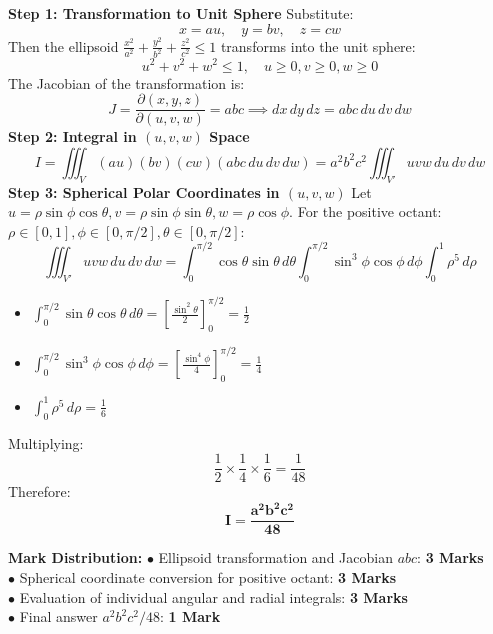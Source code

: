 \begin{solutionbox}
\textbf{Step 1: Transformation to Unit Sphere}
Substitute:
\[
x = a u, \quad y = b v, \quad z = c w
\]
Then the ellipsoid $\frac{x^2}{a^2} + \frac{y^2}{b^2} + \frac{z^2}{c^2} \le 1$ transforms into the unit sphere:
\[
u^2 + v^2 + w^2 \le 1, \quad u \ge 0, v \ge 0, w \ge 0
\]
The Jacobian of the transformation is:
\[
J = \frac{\partial(x,y,z)}{\partial(u,v,w)} = abc \implies dx \, dy \, dz = abc \, du \, dv \, dw
\]
\textbf{Step 2: Integral in $(u, v, w)$ Space}
\[
I = \iiint_V (a u)(b v)(c w) (abc \, du \, dv \, dw) = a^2 b^2 c^2 \iiint_{V'} u v w \, du \, dv \, dw
\]
\textbf{Step 3: Spherical Polar Coordinates in $(u,v,w)$}
Let $u = \rho\sin\phi\cos\theta, v = \rho\sin\phi\sin\theta, w = \rho\cos\phi$.
For the positive octant: $\rho \in [0, 1], \phi \in [0, \pi/2], \theta \in [0, \pi/2]$:
\[
\iiint_{V'} u v w \, du \, dv \, dw = \int_0^{\pi/2} \cos\theta\sin\theta \, d\theta \int_0^{\pi/2} \sin^3\phi\cos\phi \, d\phi \int_0^1 \rho^5 \, d\rho
\]
\begin{itemize}[leftmargin=6mm]
    \item $\int_0^{\pi/2} \sin\theta\cos\theta \, d\theta = \left[ \frac{\sin^2\theta}{2} \right]_0^{\pi/2} = \frac{1}{2}$
    \item $\int_0^{\pi/2} \sin^3\phi\cos\phi \, d\phi = \left[ \frac{\sin^4\phi}{4} \right]_0^{\pi/2} = \frac{1}{4}$
    \item $\int_0^1 \rho^5 \, d\rho = \frac{1}{6}$
\end{itemize}
Multiplying:
\[
\frac{1}{2} \times \frac{1}{4} \times \frac{1}{6} = \frac{1}{48}
\]
Therefore:
\[
\mathbf{I = \frac{a^2 b^2 c^2}{48}}
\]

\begin{markingrubric}
\textbf{Mark Distribution:}
$\bullet$ Ellipsoid transformation and Jacobian $abc$: \textbf{3 Marks}\\
$\bullet$ Spherical coordinate conversion for positive octant: \textbf{3 Marks}\\
$\bullet$ Evaluation of individual angular and radial integrals: \textbf{3 Marks}\\
$\bullet$ Final answer $a^2 b^2 c^2 / 48$: \textbf{1 Mark}
\end{markingrubric}
\end{solutionbox}

